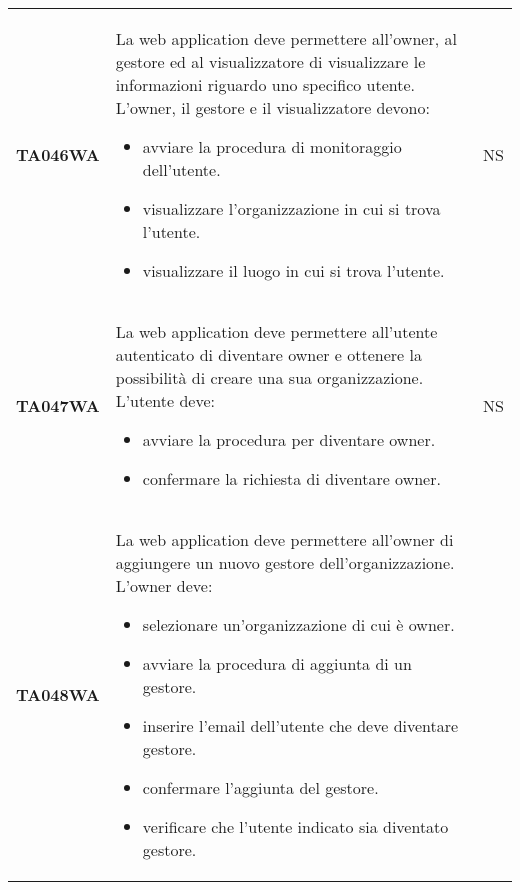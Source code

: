 \documentclass[../../piano-di-qualifica.tex]{subfiles}
\begin{document}
\begin{longtable}[H]{>{\centering\bfseries}m{3cm} >{}m{10cm} >{\centering\arraybackslash}m{3cm}}
  TA046WA           & La web application deve permettere all'owner, al gestore ed al visualizzatore di visualizzare le informazioni riguardo uno specifico utente. \newline
  L'owner, il gestore e il visualizzatore devono:
  \begin{itemize}
    \item avviare la procedura di monitoraggio dell'utente.
    \item visualizzare l'organizzazione in cui si trova l'utente.
    \item visualizzare il luogo in cui si trova l'utente.
  \end{itemize}
                    & NS                                                                                                                                                                                                                                                               \\
  TA047WA           & La web application deve permettere all'utente autenticato di diventare owner e ottenere la possibilità di creare una sua organizzazione. \newline
  L'utente deve:
  \begin{itemize}
    \item avviare la procedura per diventare owner.
    \item confermare la richiesta di diventare owner.
  \end{itemize}
                    & NS                                                                                                                                                                                                                                                               \\
  TA048WA           & La web application deve permettere all'owner di aggiungere un nuovo gestore dell'organizzazione. \newline
  L'owner deve:
  \begin{itemize}
    \item selezionare un'organizzazione di cui è owner.
    \item avviare la procedura di aggiunta di un gestore.
    \item inserire l'email dell'utente che deve diventare gestore.
    \item confermare l'aggiunta del gestore.
    \item verificare che l'utente indicato sia diventato gestore.
  \end{itemize}

\end{longtable}
\end{document}
